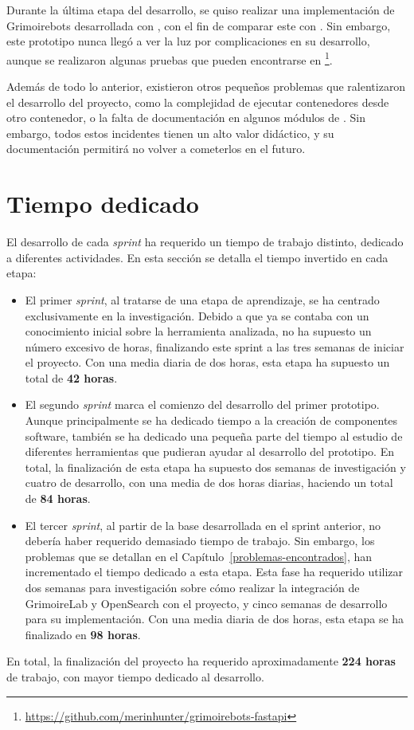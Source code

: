 Durante la última etapa del desarrollo, se quiso realizar una implementación de Grimoirebots desarrollada con , con el fin de comparar este con . Sin embargo, este prototipo nunca llegó a ver la luz por complicaciones en su desarrollo, aunque se realizaron algunas pruebas que pueden encontrarse en \footnote{\url{https://github.com/merinhunter/grimoirebots-fastapi}}.

Además de todo lo anterior, existieron otros pequeños problemas que ralentizaron el desarrollo del proyecto, como la complejidad de ejecutar contenedores desde otro contenedor, o la falta de documentación en algunos módulos de . Sin embargo, todos estos incidentes tienen un alto valor didáctico, y su documentación permitirá no volver a cometerlos en el futuro.


\section{Tiempo dedicado}

El desarrollo de cada \emph{sprint} ha requerido un tiempo de trabajo distinto, dedicado a diferentes actividades. En esta sección se detalla el tiempo invertido en cada etapa:

\begin{itemize}
    \item El primer \emph{sprint}, al tratarse de una etapa de aprendizaje, se ha centrado exclusivamente en la investigación. Debido a que ya se contaba con un conocimiento inicial sobre la herramienta analizada, no ha supuesto un número excesivo de horas, finalizando este sprint a las tres semanas de iniciar el proyecto. Con una media diaria de dos horas, esta etapa ha supuesto un total de \textbf{42 horas}.
    \item El segundo \emph{sprint} marca el comienzo del desarrollo del primer prototipo. Aunque principalmente se ha dedicado tiempo a la creación de componentes software, también se ha dedicado una pequeña parte del tiempo al estudio de diferentes herramientas que pudieran ayudar al desarrollo del prototipo. En total, la finalización de esta etapa ha supuesto dos semanas de investigación y cuatro de desarrollo, con una media de dos horas diarias, haciendo un total de \textbf{84 horas}.
    \item El tercer \emph{sprint}, al partir de la base desarrollada en el sprint anterior, no debería haber requerido demasiado tiempo de trabajo. Sin embargo, los problemas que se detallan en el Capítulo~{\ref{problemas-encontrados}}, han incrementado el tiempo dedicado a esta etapa. Esta fase ha requerido utilizar dos semanas para investigación sobre cómo realizar la integración de GrimoireLab y OpenSearch con el proyecto, y cinco semanas de desarrollo para su implementación. Con una media diaria de dos horas, esta etapa se ha finalizado en \textbf{98 horas}.
\end{itemize}

En total, la finalización del proyecto ha requerido aproximadamente \textbf{224 horas} de trabajo, con mayor tiempo dedicado al desarrollo.
